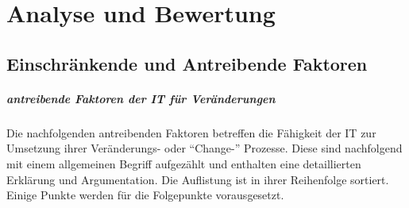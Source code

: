 \chapter{Analyse und Bewertung}


\section{Einschränkende und Antreibende Faktoren}
\label{section:regulatorik-umgang}

\paragraph{antreibende Faktoren der IT für Veränderungen}
Die nachfolgenden antreibenden Faktoren betreffen die Fähigkeit der IT zur Umsetzung ihrer Veränderungs- oder \enquote{Change-} Prozesse. Diese sind nachfolgend mit einem allgemeinen Begriff aufgezählt und enthalten eine detaillierten Erklärung und Argumentation. Die Auflistung ist in ihrer Reihenfolge sortiert. Einige Punkte werden für die Folgepunkte vorausgesetzt.

